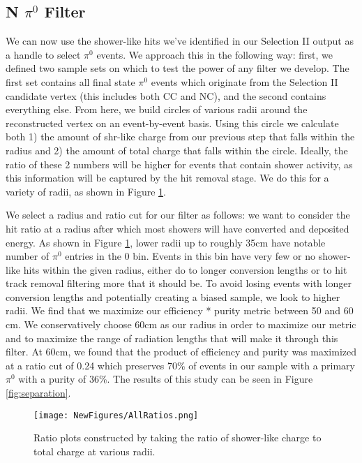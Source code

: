 \documentclass[12pt]{article}
\begin{document}
\subsection{N $\pi^0$ Filter}
We can now use the shower-like hits we've identified in our Selection II output as a handle to select $\pi^0$ events.  We approach this in the following way: first, we defined two sample sets on which to test the power of any filter we develop. The first set contains all final state $\pi^0$ events which originate from the Selection II candidate vertex (this includes both CC and NC), and the second contains everything else.  From here, we build circles of various radii around the reconstructed vertex on an event-by-event basis. Using this circle we calculate both 1) the amount of shr-like charge from our previous step that falls within the radius and 2) the amount of total charge that falls within the circle.  Ideally, the ratio of these 2 numbers will be higher for events that contain shower activity, as this information will be captured by the hit removal stage.  We do this for a variety of radii, as shown in Figure \ref{fig:all_radii}.  
\par We select a radius and ratio cut for our filter as follows:  we want to consider the hit ratio at a radius after which most showers will have converted and deposited energy.  As shown in Figure \ref{fig:all_radii}, lower radii up to roughly 35cm have notable number of $\pi^0$ entries in the 0 bin. Events in this bin have very few or no shower-like hits within the given radius, either do to longer conversion lengths or to hit track removal filtering more that it should be. To avoid losing events with longer conversion lengths and potentially creating a biased sample, we look to higher radii. We find that we maximize our efficiency * purity metric between 50 and 60 cm. We conservatively choose 60cm as our radius in order to maximize our metric and to maximize the range of radiation lengths that will make it through this filter.  At 60cm, we found that the product of efficiency and purity was maximized at a ratio cut of 0.24 which preserves 70\% of events in our sample with a primary $\pi^0$ with a purity of 36\%. The results of this study can be seen in Figure \ref{fig:separation}.

\begin{figure}[h!]
\centering
\texttt{[image: NewFigures/AllRatios.png]}
\caption{Ratio plots constructed by taking the ratio of shower-like charge to total charge at various radii. }
\label{fig:all_radii}
\end{figure}
\end{document}
